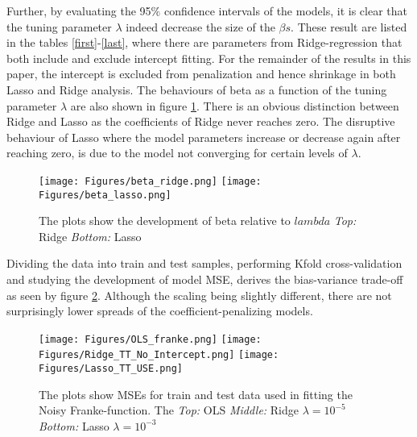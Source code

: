 \documentclass[...,numrefs]{wiley-article}
\begin{document}
\noindent Further, by evaluating the 95$\%$ confidence intervals of the models, it is clear that the tuning parameter $\lambda$ indeed decrease the size of the $\beta{s}$. These result are listed in the tables \ref{first}-\ref{last}, where there are parameters from Ridge-regression that both include and exclude intercept fitting. For the remainder of the results in this paper, the intercept is excluded from penalization and hence shrinkage in both Lasso and Ridge analysis. The behaviours of beta as a function of the tuning parameter $\lambda$ are also shown in figure \ref{Betaplot}. There is an obvious distinction between Ridge and Lasso as the coefficients of Ridge never reaches zero. The disruptive behaviour of Lasso where the model parameters increase or decrease again after reaching zero,  is due to the model not converging for certain levels of $\lambda$. 



\begin{figure}[h!]
    \centering
    \texttt{[image: Figures/beta\_ridge.png]}
    \texttt{[image: Figures/beta\_lasso.png]}
    \caption[Beta As function of $\lambda$]{The plots show the development of beta relative to $lambda$
    \textit{Top:} Ridge \textit{Bottom:} Lasso}
   \label{Betaplot}
\end{figure}




\noident Dividing the data into train and test samples, performing Kfold cross-validation and studying the development of model MSE, derives the bias-variance trade-off as seen by figure \ref{TT}. Although the scaling being slightly different, there are not surprisingly lower spreads of the coefficient-penalizing models. 

\begin{figure}[h!]
    \centering
    \texttt{[image: Figures/OLS\_franke.png]}
    \texttt{[image: Figures/Ridge\_TT\_No\_Intercept.png]}
    \texttt{[image: Figures/Lasso\_TT\_USE.png]}
    \caption[Bias-Variance-Trade Off]{The plots show MSEs for train and test data used in fitting the Noisy Franke-function. The 
    \textit{Top:} OLS \textit{Middle:} Ridge $\lambda = 10^{-5}$ \textit{Bottom:} Lasso $\lambda = 10^{-3}$}
   \label{TT}
\end{figure}

\clearpage
\end{document}
